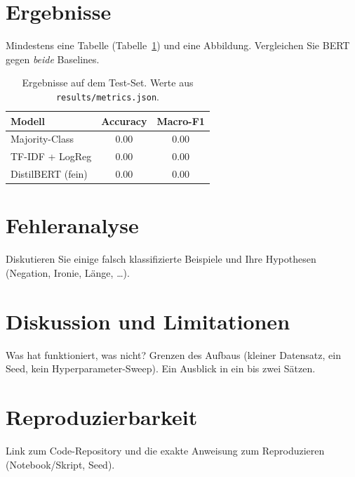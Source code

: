\documentclass[11pt]{article}
\begin{document}
\section{Ergebnisse}
Mindestens eine Tabelle (Tabelle~\ref{tab:results}) und eine Abbildung.
Vergleichen Sie BERT gegen \emph{beide} Baselines.

\begin{table}[t]
\centering
\begin{tabular}{lcc}
\toprule
Modell & Accuracy & Macro-F1 \\
\midrule
Majority-Class      & 0.00 & 0.00 \\
TF-IDF + LogReg      & 0.00 & 0.00 \\
DistilBERT (fein)    & 0.00 & 0.00 \\
\bottomrule
\end{tabular}
\caption{Ergebnisse auf dem Test-Set. Werte aus \texttt{results/metrics.json}.}
\label{tab:results}
\end{table}

\section{Fehleranalyse}
Diskutieren Sie einige falsch klassifizierte Beispiele und Ihre Hypothesen
(Negation, Ironie, Länge, \dots).

\section{Diskussion und Limitationen}
Was hat funktioniert, was nicht? Grenzen des Aufbaus (kleiner Datensatz, ein
Seed, kein Hyperparameter-Sweep). Ein Ausblick in ein bis zwei Sätzen.

\section*{Reproduzierbarkeit}
Link zum Code-Repository und die exakte Anweisung zum Reproduzieren
(Notebook/Skript, Seed).


\end{document}
